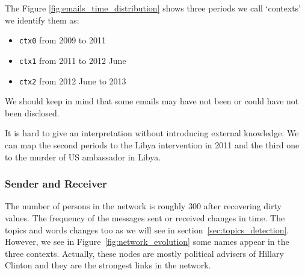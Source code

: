 \documentclass[11pt]{article}
\begin{document}
The Figure \ref{fig:emails_time_distribution} shows three periods we call `contexts' we identify them as:

\begin{itemize}
    \item \texttt{ctx0} from 2009 to 2011
    \item \texttt{ctx1} from 2011 to 2012 June
    \item \texttt{ctx2} from 2012 June to 2013
\end{itemize}

We should keep in mind that some emails may have not been or could have not been disclosed.

It is hard to give an interpretation without introducing external knowledge. We can map the second periods to the Libya intervention in 2011 and the third one to the murder of US ambassador in Libya.

\subsubsection{Sender and Receiver}

The number of persons in the network is roughly $300$ after recovering dirty values. The frequency of the messages sent or received changes in time. The topics and words changes too as we will see in section~\ref{sec:topics_detection}. However, we see in Figure~\ref{fig:network_evolution} some names appear in the three contexts. Actually, these nodes are mostly political advisers of Hillary Clinton and they are the strongest links in the network.
\end{document}
